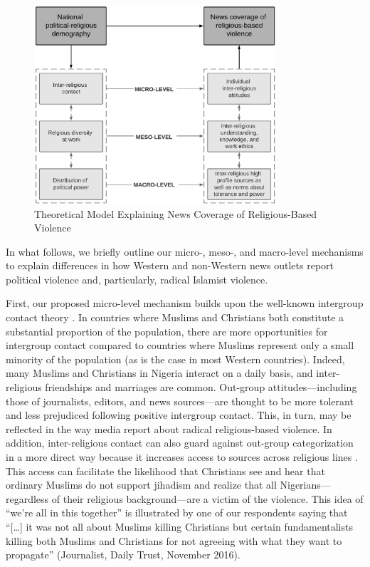 \vspace{3mm}
\begin{figure}[H]
\centering
\includegraphics[width=0.8\textwidth]{Chapter_4/art3-figure1.pdf}
\caption{Theoretical Model Explaining News Coverage of Religious-Based Violence}
\label{fig:art3-fig1}    
\end{figure}
\newpage


In what follows, we briefly outline our micro-, meso-, and macro-level mechanisms to explain differences in how Western and non-Western news outlets report political violence and, particularly, radical Islamist violence. 


First, our proposed micro-level mechanism builds upon the well-known intergroup contact theory \citep{Pettigrew2006, Pettigrew2008a}. In countries where Muslims and Christians both constitute a substantial proportion of the population, there are more opportunities for intergroup contact compared to countries where Muslims represent only a small minority of the population (as is the case in most Western countries). Indeed, many Muslims and Christians in Nigeria interact on a daily basis, and inter-religious friendships and marriages are common. Out-group attitudes---including those of journalists, editors, and news sources---are thought to be more tolerant and less prejudiced following positive intergroup contact. This, in turn, may be reflected in the way media report about radical religious-based violence. In addition, inter-religious contact can also guard against out-group categorization in a more direct way because it increases access to sources across religious lines \citep[see also][]{Gonen2019}. This access can facilitate the likelihood that Christians see and hear that ordinary Muslims do not support jihadism and realize that all Nigerians---regardless of their religious background---are a victim of the violence. This idea of ``we're all in this together'' is illustrated by one of our respondents saying that ``[{\dots}] it was not all about Muslims killing Christians but certain fundamentalists killing both Muslims and Christians for not agreeing with what they want to propagate'' (Journalist, Daily Trust, November 2016). 



